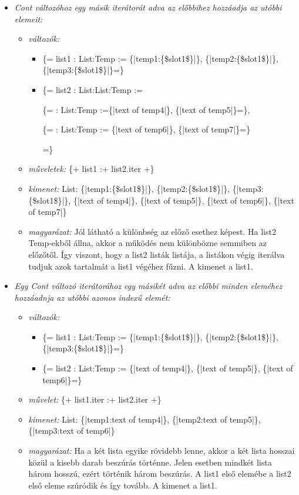 {\begin{itemize}
\item \emph{Cont változóhoz egy másik iterátorát adva az előbbihez hozzáadja az utóbbi elemeit:}
\begin{itemize}
\item \emph{változók:}
\begin{itemize}
\item \{= list1 : List:Temp  := \{|temp1:\{\$slot1\$\}|\}, \{|temp2:\{\$slot1\$\}|\}, \{|temp3:\{\$slot1\$\}|\}=\}
\item \{= list2 : List:List:Temp  := 

		\{= : List:Temp :=\{|text of temp4|\}, \{|text of temp5|\}=\},
		
	 	\{= : List:Temp := \{|text of temp6|\}, \{|text of temp7|\}=\}
	 	
	 	=\}
\end{itemize}
\item \emph{műveletek:}
\{+ list1 :+ list2.iter +\}
\item \emph{kimenet:}
List: \{|temp1:\{\$slot1\$\}|\}, \{|temp2:\{\$slot1\$\}|\}, \{|temp3:\{\$slot1\$\}|\}, \{|text of temp4|\}, \{|text of temp5|\}, \{|text of temp6|\}, \{|text of temp7|\}
\item \emph{magyarázat:}
Jól látható a különbség az előző esethez képest.
Ha list2 Temp-ekből állna, akkor a működés nem különbözne semmiben az előzőtől.
Így viszont, hogy a list2 listák listája, a listákon végig iterálva tudjuk azok tartalmát a list1 végéhez fűzni.
A kimenet a list1.
\end{itemize}

\item \emph{ Egy Cont változó iterátorához egy másikét adva az előbbi minden eleméhez hozzáadnja az utóbbi azonos indexű elemét:}
\begin{itemize}
\item \emph{változók:}
\begin{itemize}
\item \{= list1 : List:Temp  := \{|temp1:\{\$slot1\$\}|\}, \{|temp2:\{\$slot1\$\}|\}, \{|temp3:\{\$slot1\$\}|\}=\}
\item \{= list2 : List:Temp  := \{|text of temp4|\}, \{|text of temp5|\}, \{|text of temp6|\}=\}
\end{itemize}
\item \emph{művelet:}
\{+ list1.iter :+ list2.iter +\}
\item \emph{kimenet:}
List: \{|temp1:text of temp4|\}, \{|temp2:text of temp5|\}, \{|temp3:text of temp6|\}
\item \emph{magyarázat:}
Ha a két lista egyike rövidebb lenne, akkor a két lista hosszai közül a kisebb darab beszúrás történne.
Jelen esetben mindkét lista három hosszú, ezért történik három beszúrás.
A list1 első elemébe a list2 első eleme szúródik és így tovább.
A kimenet a list1.
\end{itemize}


\end{itemize}}

